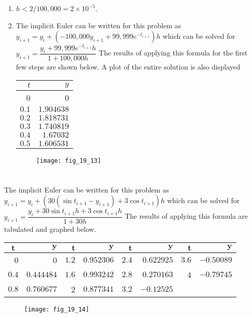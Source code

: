 \documentclass[../main.tex]{subfiles}
\begin{document}
\section{}
\begin{enumerate}[label=\bfseries(\alph*)]
\item $h<2 / 100,000=2 \times 10^{-5}$.
	\bigbreak
\item The implicit Euler can be written for this problem as
	\bigbreak
$y_{i+1}=y_{i}+\left(-100,000 y_{i+1}+99,999 e^{-t_{i+1}}\right) h$
	\bigbreak
which can be solved for
	\bigbreak
$y_{i+1}=\dfrac{y_{i}+99,999 e^{-t_{i+1}} h}{1+100,000 h}$
	\bigbreak
The results of applying this formula for the first few steps are shown below. A plot of the entire solution is also displayed
	\bigbreak
\begin{tabular}{rr}
\hline
$t$ & $y$ \\
\hline
0 & 0 \\
$0.1$ & $1.904638$ \\
$0.2$ & $1.818731$ \\
$0.3$ & $1.740819$ \\
$0.4$ & $1.67032$ \\
$0.5$ & $1.606531$ \\
\hline
\end{tabular}
	\bigbreak
	\begin{figure}[H]
		\texttt{[image: fig\_19\_13]}
		\label{fig:fig_19_13}
	\end{figure}
	\bigbreak
\end{enumerate}



\section{}
The implicit Euler can be written for this problem as
	\bigbreak
$y_{i+1}=y_{i}+\left(30\left(\sin t_{i+1}-y_{i+1}\right)+3 \cos t_{i+1}\right) h$
	\bigbreak
which can be solved for
	\bigbreak
$y_{i+1}=\dfrac{y_{i}+30 \sin t_{i+1} h+3 \cos t_{i+1} h}{1+30 h}$
	\bigbreak
The results of applying this formula are tabulated and graphed below.
	\bigbreak
\begin{tabular}{rrrrrrrr}
\hline
\multicolumn{1}{c}{$\boldsymbol{t}$} & $\boldsymbol{y}$ & $\boldsymbol{t}$ & $\boldsymbol{y}$ & $\boldsymbol{t}$ & $\boldsymbol{y}$ & $\boldsymbol{t}$ & $\boldsymbol{y}$ \\
\hline
0 & 0 & $1.2$ & $0.952306$ & $2.4$ & $0.622925$ & $3.6$ & $-0.50089$ \\
$0.4$ & $0.444484$ & $1.6$ & $0.993242$ & $2.8$ & $0.270163$ & 4 & $-0.79745$ \\
$0.8$ & $0.760677$ & 2 & $0.877341$ & $3.2$ & $-0.12525$ &  &  \\
\hline
\end{tabular}
	\bigbreak
	\begin{figure}[H]
		\texttt{[image: fig\_19\_14]}
		\label{fig:fig_19_14}
	\end{figure}
	\bigbreak
\end{document}
